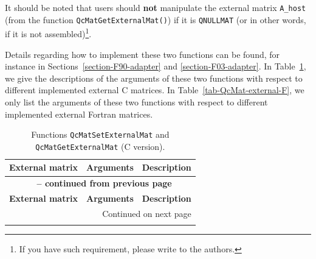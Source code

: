 \documentclass[a4paper,11pt,twoside,openright]{book}
\begin{document}
It should be noted that users should \textbf{not} manipulate the external
matrix \verb|A_host| (from the function \verb|QcMatGetExternalMat()|) if it is
\verb|QNULLMAT| (or in other words, if it is not assembled)\footnote{If
you have such requirement, please write to the authors.}.

Details regarding how to implement these two functions can be found, for instance in
Sections~\ref{section-F90-adapter} and \ref{section-F03-adapter}. In Table~\ref{tab-QcMat-external-C},
we give the descriptions of the arguments of these two functions with respect to
different implemented external C matrices. In Table~\ref{tab-QcMat-external-F}, we
only list the arguments of these two functions with respect to different implemented
external Fortran matrices.

\begin{center}
  \small
  \begin{longtable}{p{}|l|p{}}
    \caption{Functions \texttt{QcMatSetExternalMat}
      and \texttt{QcMatGetExternalMat} (C version).}
    \label{tab-QcMat-external-C}\\
    \hline\hline
    \textbf{External matrix} & \textbf{Arguments} & \textbf{Description}\\
    \hline
    \endfirsthead
    \multicolumn{3}{c}{{\bfseries \tablename\ \thetable{} -- continued from previous page}}\\
    \hline\hline
    \textbf{External matrix} & \textbf{Arguments} & \textbf{Description}\\
    \hline
    \endhead
    \hline
    \multicolumn{3}{r}{Continued on next page}\\
    \hline
    \endfoot
    \hline\hline
    \endlastfoot
%

\end{longtable}
\end{center}
\end{document}
